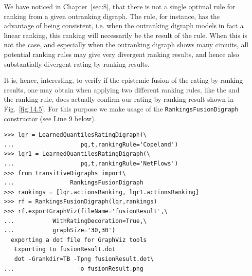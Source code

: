 We have noticed in Chapter~\vref{sec:8}, that there is not a single optimal rule for ranking from a given outranking digraph. The \Copeland rule, for instance, has the advantage of being \Condorcet consistent, i.e. when the outranking digraph models in fact a linear ranking, this ranking will necessarily be the result of the \Copeland* rule. When this is not the case, and especially when the outranking digraph shows many circuits, all potential ranking rules may give very divergent ranking results, and hence also substantially divergent rating-by-ranking results.

It is, hence, interesting, to verify if the epistemic fusion of the rating-by-ranking results, one may obtain when applying two different ranking rules, like the \Copeland and the \NetFlows ranking rule, does actually confirm our rating-by-ranking result shown in Fig.~\vref{fig:14.5}. For this purpose we make usage of the \texttt{RankingsFusionDigraph} constructor (see Line 9 below).
\begin{lstlisting}
>>> lqr = LearnedQuantilesRatingDigraph(\
...                   pq,t,rankingRule='Copeland')
>>> lqr1 = LearnedQuantilesRatingDigraph(\
...                   pq,t,rankingRule='NetFlows')
>>> from transitiveDigraphs import\
...                RankingsFusionDigraph
>>> rankings = [lqr.actionsRanking, lqr1.actionsRanking]
>>> rf = RankingsFusionDigraph(lqr,rankings)
>>> rf.exportGraphViz(fileName='fusionResult',\
...           WithRatingDecoration=True,\
...           graphSize='30,30')
  exporting a dot file for GraphViz tools
   Exporting to fusionResult.dot
   dot -Grankdir=TB -Tpng fusionResult.dot\
...                  -o fusionResult.png
\end{lstlisting}
